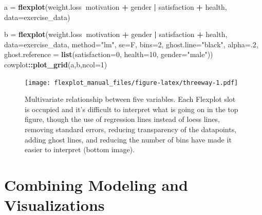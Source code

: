 \documentclass[,]{book}
\newenvironment{Shaded}{\begin{snugshade}}{\end{snugshade}}
\newcommand{\KeywordTok}[1]{\textcolor[rgb]{0.13,0.29,0.53}{\textbf{#1}}}
\newcommand{\DataTypeTok}[1]{\textcolor[rgb]{0.13,0.29,0.53}{#1}}
\newcommand{\DecValTok}[1]{\textcolor[rgb]{0.00,0.00,0.81}{#1}}
\newcommand{\StringTok}[1]{\textcolor[rgb]{0.31,0.60,0.02}{#1}}
\newcommand{\OperatorTok}[1]{\textcolor[rgb]{0.81,0.36,0.00}{\textbf{#1}}}
\newcommand{\NormalTok}[1]{#1}
\begin{document}
\begin{Shaded}
\begin{Highlighting}[]
\NormalTok{a =}\StringTok{ }\KeywordTok{flexplot}\NormalTok{(weight.loss}\OperatorTok{~}\NormalTok{motivation }\OperatorTok{+}\StringTok{ }\NormalTok{gender }\OperatorTok{|}\StringTok{ }\NormalTok{satisfaction }\OperatorTok{+}\StringTok{ }\NormalTok{health, }
         \DataTypeTok{data=}\NormalTok{exercise_data)}

\NormalTok{b =}\StringTok{ }\KeywordTok{flexplot}\NormalTok{(weight.loss}\OperatorTok{~}\NormalTok{motivation }\OperatorTok{+}\StringTok{ }\NormalTok{gender }\OperatorTok{|}\StringTok{ }\NormalTok{satisfaction }\OperatorTok{+}\StringTok{ }\NormalTok{health, }
         \DataTypeTok{data=}\NormalTok{exercise_data, }
         \DataTypeTok{method=}\StringTok{"lm"}\NormalTok{, }\DataTypeTok{se=}\NormalTok{F, }\DataTypeTok{bins=}\DecValTok{2}\NormalTok{, }\DataTypeTok{ghost.line=}\StringTok{"black"}\NormalTok{, }\DataTypeTok{alpha=}\NormalTok{.}\DecValTok{2}\NormalTok{,}
         \DataTypeTok{ghost.reference =} \KeywordTok{list}\NormalTok{(}\DataTypeTok{satisfaction=}\DecValTok{0}\NormalTok{, }\DataTypeTok{health=}\DecValTok{10}\NormalTok{, }\DataTypeTok{gender=}\StringTok{"male"}\NormalTok{))}
\NormalTok{cowplot}\OperatorTok{::}\KeywordTok{plot_grid}\NormalTok{(a,b,}\DataTypeTok{ncol=}\DecValTok{1}\NormalTok{)}
\end{Highlighting}
\end{Shaded}

\begin{figure}
\centering
\texttt{[image: flexplot\_manual\_files/figure-latex/threeway-1.pdf]}
\caption{\label{fig:threeway}Multivariate relationship between five
variables. Each Flexplot slot is occupied and it's difficult to
interpret what is going on in the top figure, though the use of
regression lines instead of loess lines, removing standard errors,
reducing transparency of the datapoints, adding ghost lines, and
reducing the number of bins have made it easier to interpret (bottom
image).}
\end{figure}

\chapter*{Combining Modeling and
Visualizations}\label{combining-modeling-and-visualizations}
\end{document}
